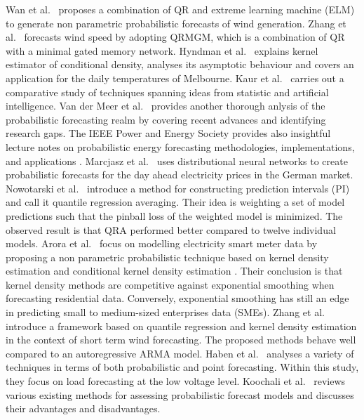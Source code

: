 Wan et al.\ \cite{wan2016direct} proposes a combination of QR and extreme learning machine (ELM) to generate non parametric probabilistic forecasts of wind generation.
Zhang et al.\ \cite{zhang2019wind} forecasts wind speed by adopting QRMGM, which is a combination of QR with a minimal gated memory network.
Hyndman et al.\ \cite{hyndman1996estimating} explains kernel estimator of conditional density, analyses its asymptotic behaviour and covers an application for the daily temperatures of Melbourne.
Kaur et al.\ \cite{kaur2022energy} carries out a comparative study of techniques spanning ideas from statistic and artificial intelligence.
Van der Meer et al.\ \cite{van2018review} provides another thorough anlysis of the probabilistic forecasting realm by covering recent advances and identifying research gaps.
The IEEE Power and Energy Society provides also insightful lecture notes on probabilistic energy forecasting methodologies,
implementations, and applications .
Marcjasz et al.\ \cite{probablistic_electricity_forecast2} uses distributional neural networks to create probabilistic forecasts for the day ahead electricity prices in the German market.
Nowotarski et al.\ \cite{nowotarski2015computing} introduce a method for constructing prediction intervals (PI) and call it quantile regression averaging. Their idea is weighting a set of model predictions such that the pinball loss of the weighted model is minimized. The observed result is that QRA performed better compared to twelve individual models.
Arora et al.\ \cite{arora2016forecasting} focus on modelling electricity smart meter data by proposing a non parametric probabilistic technique based on kernel density estimation and conditional kernel density estimation \cite{rosenblatt1969conditional, hyndman1996estimating}. Their conclusion is that kernel density methods are competitive against exponential smoothing when forecasting residential data. Conversely, exponential smoothing has still an edge in predicting small to medium-sized enterprises data (SMEs).
Zhang et al.\ \cite{zhang2020probability} introduce a framework based on quantile regression and kernel density estimation in the context of short term wind forecasting. The proposed methods behave well compared to an autoregressive ARMA model.
Haben et al.\ \cite{haben2018short} analyses a variety of techniques in terms of both probabilistic and point forecasting. Within this study, they focus on load forecasting at the low voltage level.
Koochali et al.\ \cite{koochali2022random} reviews various existing methods for assessing probabilistic forecast models and discusses their advantages and disadvantages.
